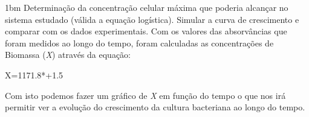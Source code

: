\documentclass[\mainfilename]{subfiles}
\begin{document}
\begin{sectionBox}1bm{
    Determinação da concentração celular máxima que poderia alcançar no sistema estudado (válida a equação logística). Simular a curva de crescimento e comparar com os dados experimentais.
} %
    Com os valores das absorvâncias que foram medidos ao longo do tempo, foram calculadas as concentrações de Biomassa (\textit{X}) através da equação:
    \begin{BM}
        X=1171.8*+1.5
    \end{BM}
    Com isto podemos fazer um gráfico de \textit{X} em função do tempo o que nos irá permitir ver a evolução do crescimento da cultura bacteriana ao longo do tempo.
    \begin{center}
        \tikzset{external/remake next=true}
\end{center}
\end{sectionBox}
\end{document}
